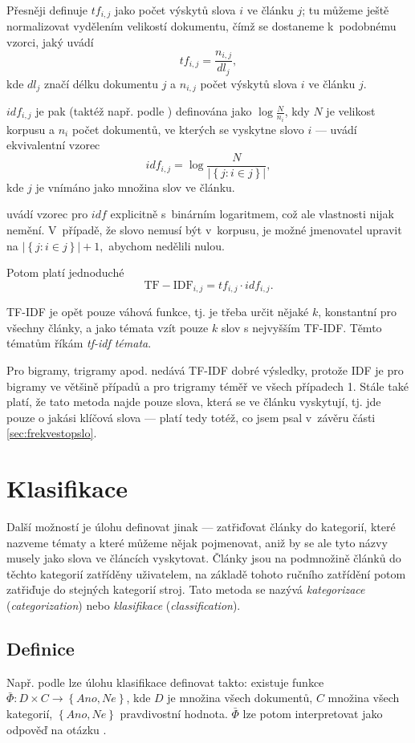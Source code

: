 \documentclass[12pt,a4paper]{report}
\begin{document}
Přesněji definuje \cite{understanding} $tf_{i,j}$  jako počet výskytů slova $i$ ve článku $j$; tu můžeme ještě normalizovat vydělením velikostí do\-ku\-men\-tu, čímž se do\-sta\-ne\-me k~podobnému vzorci, jaký uvádí \cite{wikitfidf} $$tf_{i,j}=\frac{n_{i,j}}{dl_j},$$ kde $dl_j$ značí délku dokumentu $j$ a $n_{i,j}$ počet výskytů slova $i$ ve článku $j$.

$idf_{i,j}$ je pak (taktéž např. podle \cite{understanding}) definována jako $\log\frac{N}{n_i}$, kdy $N$ je velikost korpusu a $n_i$ počet dokumentů, ve kterých se vyskytne slovo $i$ --- \cite{wikitfidf} uvádí ekvivalentní vzorec $$idf_{i,j}=\log\frac{N}{\left|\left\{j: i \in j\right\}\right|},$$ kde $j$ je vnímáno jako množina slov ve článku.

\cite{introduction} uvádí vzorec pro $idf$ explicitně s~binárním logaritmem, což ale vlastnosti nijak nemění. V~případě, že slovo nemusí být v~korpusu, je možné jmenovatel upravit na $\left|\left\{j: i \in j\right\}\right|+1,$ abychom nedělili nulou.

Potom platí jednoduché $$\mathrm{TF-IDF}_{i,j}=tf_{i,j}\cdot idf_{i,j}.$$

TF-IDF je opět pouze váhová funkce, tj. je třeba určit nějaké $k$, konstantní pro všechny články, a jako témata vzít pouze  $k$ slov s nejvyšším TF-IDF. Těmto tématům říkám \emph{tf-idf témata}.

Pro bigramy, trigramy apod. nedává TF-IDF dobré výsledky, protože IDF je pro bigramy ve většině případů a pro trigramy téměř ve všech případech 1. Stále také platí, že tato metoda najde pouze slova, která se ve článku vyskytují, tj. jde pouze o jakási klíčová slova --- platí tedy totéž, co jsem psal v~závěru části \ref{sec:frekvestopslo}.

\section{Klasifikace}
\label{sec:kategorizace}
Další možností je úlohu definovat jinak --- zatřiďovat články do kategorií, které nazveme tématy a které můžeme nějak pojmenovat, aniž by se ale tyto názvy musely jako slova ve článcích vyskytovat. Články jsou na podmnožině článků do těchto kategorií zatříděny uživatelem, na základě tohoto ručního zatřídění potom zatřiďuje do stejných kategorií stroj. Tato metoda se nazývá \emph{kategorizace} (\emph{categorization}) nebo \emph{klasifikace} (\emph{classification}).

\subsection{Definice}
 \label{sec:kategorizace_def}
Např. podle \cite{machine_intro} lze úlohu klasifikace definovat takto: existuje funkce $\bar{\Phi}: D \times C \rightarrow \left\{Ano, Ne\right\}$, kde $D$ je množina všech dokumentů, $C$ množina všech kategorií, $\left\{Ano, Ne\right\}$ pravdivostní hodnota. $\bar{\Phi}$ lze potom interpretovat jako odpověď na otázku .
\end{document}
